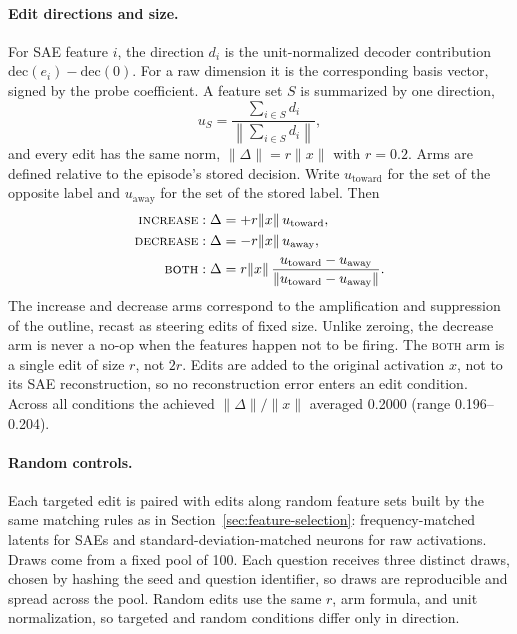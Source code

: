\paragraph{Edit directions and size.} For SAE feature $i$, the direction
$d_i$ is the unit-normalized decoder contribution
$\mathrm{dec}(e_i)-\mathrm{dec}(0)$. For a raw dimension it is the
corresponding basis vector, signed by the probe coefficient. A feature set $S$
is summarized by one direction,
\begin{equation}
    u_S = \frac{\sum_{i\in S} d_i}{\left\lVert \sum_{i\in S} d_i \right\rVert},
\end{equation}
and every edit has the same norm, $\lVert\Delta\rVert = r\lVert x\rVert$
with $r=0.2$. Arms are defined relative to the episode's stored decision.
Write $u_{\mathrm{toward}}$ for the set of the opposite label and
$u_{\mathrm{away}}$ for the set of the stored label. Then
\begin{align}
    \textsc{increase}:\;& \Delta = +r\lVert x\rVert\, u_{\mathrm{toward}},\\
    \textsc{decrease}:\;& \Delta = -r\lVert x\rVert\, u_{\mathrm{away}},\\
    \textsc{both}:\;& \Delta = r\lVert x\rVert\,
        \frac{u_{\mathrm{toward}}-u_{\mathrm{away}}}
             {\lVert u_{\mathrm{toward}}-u_{\mathrm{away}}\rVert}.
\end{align}
The increase and decrease arms correspond to the amplification and
suppression of the outline, recast as steering edits of fixed size. Unlike
zeroing, the decrease arm is never a no-op when the features happen not to be
firing. The \textsc{both} arm is a single edit of size $r$, not $2r$. Edits
are added to the original activation $x$, not to its SAE reconstruction, so no
reconstruction error enters an edit condition. Across all conditions the
achieved $\lVert\Delta\rVert/\lVert x\rVert$ averaged 0.2000 (range
0.196--0.204).

\paragraph{Random controls.} Each targeted edit is paired with edits along
random feature sets built by the same matching rules as in
Section~\ref{sec:feature-selection}: frequency-matched latents for SAEs and
standard-deviation-matched neurons for raw activations. Draws come from a
fixed pool of 100. Each question receives three distinct draws, chosen by
hashing the seed and question identifier, so draws are reproducible and
spread across the pool. Random edits use the same $r$, arm formula, and unit
normalization, so targeted and random conditions differ only in direction.

